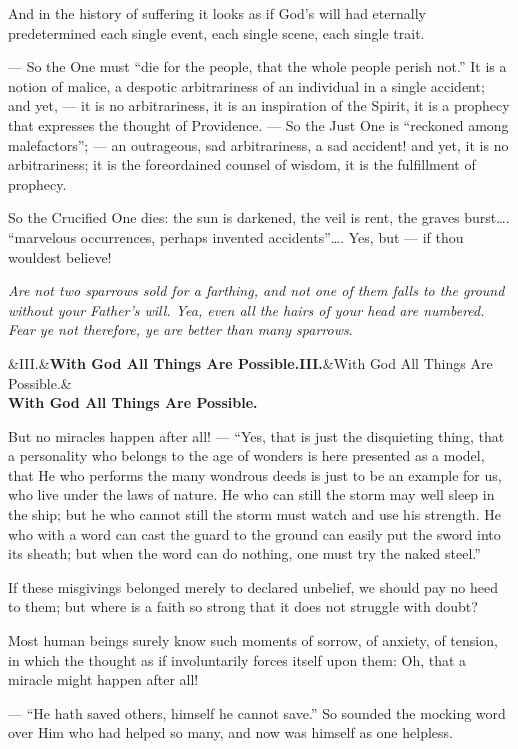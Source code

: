 \documentclass[12pt,a4paper,openany]{book}
\newcommand{\opage}[1]{\marginnote{\footnotesize\textit{[#1]}}}
\newcommand{\stykke}[2]{\begin{center}\ifx&#1&\textbf{#2}\else\textbf{#1}\ifx&#2&\else\\[0.2em]\textbf{#2}\fi\fi\end{center}}
\begin{document}
And in the history of suffering it looks as if
God's will had eternally predetermined each single event,
each single scene, each single trait.

--- So the One must ``die for the people,
that the whole people perish not.'' It
is a notion of malice, a despotic arbitrariness
of an individual in a single accident; and
yet, --- it is no arbitrariness, it
is an inspiration of the Spirit, it is a prophecy
that expresses the thought of Providence.
--- So the Just One is ``reckoned
among malefactors''; --- an outrageous, sad
arbitrariness, a sad accident! and yet,
it is no arbitrariness; it is the foreordained
counsel of wisdom, it is the fulfillment
of prophecy.

\setcounter{footnote}{0}%
\opage{42}So the Crucified One dies: the sun is darkened,
the veil is rent, the graves burst\dots{}.
``marvelous occurrences, perhaps invented accidents''\dots{}.
Yes, but --- if thou wouldest
believe!

\emph{Are not two sparrows sold for a farthing,
and not one of them falls to the ground without your Father's will. Yea,
even all the hairs of your head are numbered.
Fear ye not therefore, ye are better than
many sparrows}.

\stykke{III.}{With God All Things Are Possible.}

But no miracles happen after all! ---
``Yes, that is just the disquieting thing, that a personality
who belongs to the age of wonders is here
presented as a model, that He who performs the
many wondrous deeds is just to be an example
for us, who live under the laws of nature. He who
can still the storm may well sleep in
the ship; but he who cannot still the storm
must watch and use his strength. He who
with a word can cast the guard to the ground can
easily put the sword into its sheath; but when
\setcounter{footnote}{0}%
\opage{43}the word can do nothing, one must try the
naked steel.''

If these misgivings belonged merely to
declared unbelief, we should pay no heed
to them; but where is a faith so strong that it
does not struggle with doubt?

Most human beings surely know such
moments of sorrow, of anxiety, of tension,
in which the thought as if involuntarily forces itself
upon them: Oh, that a miracle might happen after all!

--- ``He hath saved others, himself he cannot
save.'' So sounded the mocking word
over Him who had helped so many, and
now was himself as one helpless.
\end{document}
